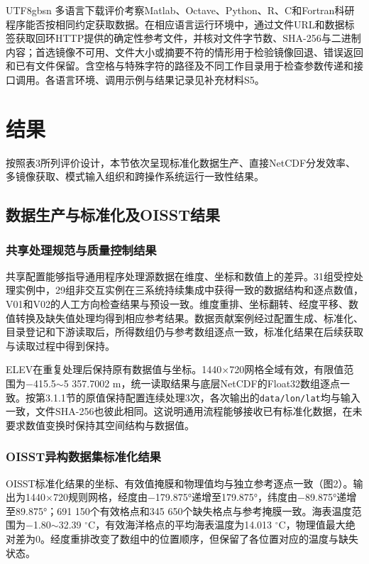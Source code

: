 \documentclass[numdoi]{chinese}
\begin{document}
\begin{CJK}{UTF8}{gbsn}
多语言下载评价考察Matlab、Octave、Python、R、C和Fortran科研程序能否按相同约定获取数据。在相应语言运行环境中，通过文件URL和数据标签获取回环HTTP提供的确定性参考文件，并核对文件字节数、SHA-256与二进制内容；首选镜像不可用、文件大小或摘要不符的情形用于检验镜像回退、错误返回和已有文件保留。含空格与特殊字符的路径及不同工作目录用于检查参数传递和接口调用。各语言环境、调用示例与结果记录见补充材料S5。

\section{结果}
按照表3所列评价设计，本节依次呈现标准化数据生产、直接NetCDF分发效率、多镜像获取、模式输入组织和跨操作系统运行一致性结果。

\subsection{数据生产与标准化及OISST结果}
\subsubsection{共享处理规范与质量控制结果}
共享配置能够指导通用程序处理源数据在维度、\allowbreak{}坐标和数值上的差异。31组受控处理实例中，29组非交互实例在三系统持续集成中获得一致的数据结构和逐点数值，V01和V02的人工方向检查结果与预设一致。维度重排、\allowbreak{}坐标翻转、\allowbreak{}经度平移、\allowbreak{}数值转换及缺失值处理均得到相应参考结果。数据贡献案例经过配置生成、\allowbreak{}标准化、\allowbreak{}目录登记和下游读取后，所得数组仍与参考数组逐点一致，标准化结果在后续获取与读取过程中得到保持。

ELEV在重复处理后保持原有数据值与坐标。1440\ensuremath{\times}720网格全域有效，有限值范围为\ensuremath{-}415.5\ensuremath{\sim}5 357.7002 m，统一读取结果与底层NetCDF的Float32数组逐点一致。按第3.1.1节的原值保持配置连续处理3次，各次输出的\nolinkurl{data/lon/lat}均与输入一致，文件SHA-256也彼此相同。这说明通用流程能够接收已有标准化数据，在未要求数值变换时保持其空间结构与数据值。

\subsubsection{OISST异构数据集标准化结果}
OISST标准化结果的坐标、有效值掩膜和物理值均与独立参考逐点一致（图2）。输出为1440\ensuremath{\times}720规则网格，经度由\ensuremath{-}179.875°递增至179.875°，纬度由\ensuremath{-}89.875°递增至89.875°；691 150个有效格点和345 650个缺失格点与参考掩膜一致。海表温度范围为\ensuremath{-}1.80\ensuremath{\sim}32.39 \ensuremath{{}^{\circ}\mathrm{C}}，有效海洋格点的平均海表温度为14.013 \ensuremath{{}^{\circ}\mathrm{C}}，物理值最大绝对差为0。经度重排改变了数组中的位置顺序，但保留了各位置对应的温度与缺失状态。


\end{CJK}
\end{document}
